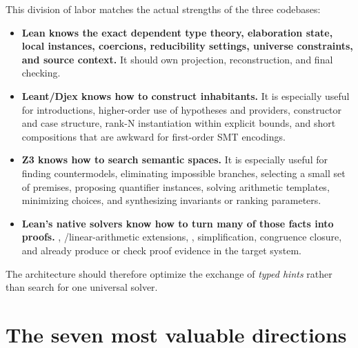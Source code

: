 \documentclass[11pt,letterpaper,openany]{report}
\newcommand{\code}[1]{\texttt{\detokenize{#1}}}
\begin{document}
This division of labor matches the actual strengths of the three codebases:

\begin{itemize}
  \item \textbf{Lean knows the exact dependent type theory, elaboration state, local
        instances, coercions, reducibility settings, universe constraints, and source
        context.} It should own projection, reconstruction, and final checking.
  \item \textbf{Leant/Djex knows how to construct inhabitants.} It is especially useful
        for introductions, higher-order use of hypotheses and providers, constructor
        and case structure, rank-N instantiation within explicit bounds, and short
        compositions that are awkward for first-order SMT encodings.
  \item \textbf{Z3 knows how to search semantic spaces.} It is especially useful for
        finding countermodels, eliminating impossible branches, selecting a small set
        of premises, proposing quantifier instances, solving arithmetic templates,
        minimizing choices, and synthesizing invariants or ranking parameters.
  \item \textbf{Lean's native solvers know how to turn many of those facts into proofs.}
        \code{grind}, \code{omega}/linear-arithmetic extensions,
        \code{grobner}, simplification, congruence closure, and \code{bv_decide}
        already produce or check proof evidence in the target system.
\end{itemize}

The architecture should therefore optimize the exchange of \emph{typed hints} rather
than search for one universal solver.

\section{The seven most valuable directions}
\end{document}
